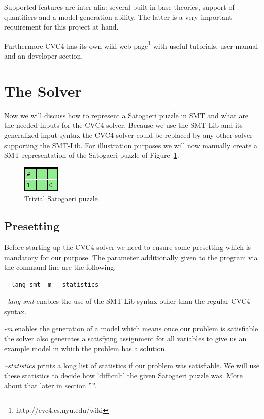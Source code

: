 Supported features are inter alia: several built-in base theories, support of quantifiers and a model generation ability. The latter is a very important requirement for this project at hand.

Furthermore CVC4 has its own wiki-web-page\footnote{http://cvc4.cs.nyu.edu/wiki} with useful tutorials, user manual and an developer section.

\section{The Solver} \label{The Solver}
Now we will discuss how to represent a Satogaeri puzzle in SMT and what are the needed inputs for the CVC4 solver. Because we use the SMT-Lib and its generalized input syntax the CVC4 solver could be replaced by any other solver supporting the SMT-Lib. For illustration purposes we will now manually create a SMT representation of the Satogaeri puzzle of Figure~\ref{fig:solver_example}.
\begin{figure}
  \centering
  \includegraphics[scale=1]{Pictures/Solver_example.png} 
  \caption{Trivial Satogaeri puzzle}
  \label{fig:solver_example}
\end{figure}

\subsection{Presetting}
Before starting up the CVC4 solver we need to ensure some presetting which is mandatory for our purpose.
The parameter additionally given to the program via the command-line are the following:
\begin{lstlisting}
--lang smt -m --statistics
\end{lstlisting}

\emph{--lang smt} enables the use of the SMT-Lib syntax other than the regular CVC4 syntax.

\emph{-m} enables the generation of a model which means once our problem is satisfiable the solver also generates a satisfying assignment for all variables to give us an example model in which the problem has a solution.

\emph{--statistics} prints a long list of statistics if our problem was satisfiable. We will use these statistics to decide how 'difficult' the given Satogaeri puzzle was. More about that later in section ''''. 

